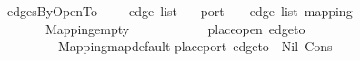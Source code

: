 \ edgesByOpenTo\ {\isacharcolon}{\isacharcolon}\ {\isachardoublequoteopen}{\isacharparenleft}\ \ \ edge\ list\isanewline
{}\ {\isacharparenleft}{\isacharparenleft}\ \ port{\isacharcomma}\ {\isacharparenleft}\ \ \ edge\ list{\isacharparenright}\ mapping{\isachardoublequoteclose}\isanewline
\ \ \isanewline
\ \ \ \ {\isachardoublequoteopen}\ {\isacharbrackleft}{\isacharbrackright}\ {\isacharequal}\ Mapping{\isachardot}empty{\isachardoublequoteclose}\isanewline
\ \ {\isacharbar}\ {\isachardoublequoteopen}\ {\isacharparenleft}\ {\isacharequal}\isanewline
\ \ \ \ {\isacharparenleft}\ \ place{\isacharunderscore}open\ {\isacharparenleft}edge{\isacharunderscore}to\ \isanewline
\ \ \ \ \ \ \ \ \ Mapping{\isachardot}map{\isacharunderscore}default\isanewline
{}place{\isacharunderscore}port\ {\isacharparenleft}edge{\isacharunderscore}to\ \ Nil\ {\isacharparenleft}Cons\ \ {\isacharparenleft}\ \isanewline
\ \ \ \ \ \ \ \ \ \ 
